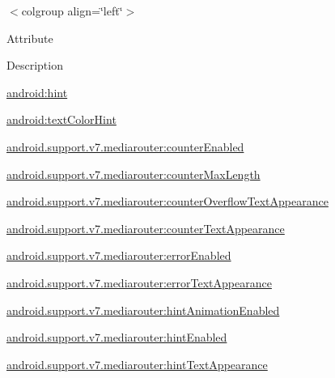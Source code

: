 \tabulinesep=1mm
\begin{longtabu} spread 0pt [c]{*{0}{|X[-1]}|}
\hline
\end{longtabu}
$<$colgroup align=\char`\"{}left\char`\"{}$>$ 

Attribute

Description 

{\ttfamily \hyperlink{classandroid_1_1support_1_1v7_1_1mediarouter_1_1R_1_1styleable_a9a349e2d2e549ba75b3cd7d7843904c6}{android\+:hint}}

{\ttfamily \hyperlink{classandroid_1_1support_1_1v7_1_1mediarouter_1_1R_1_1styleable_a4b215970513b838b98f7dd32725bd67b}{android\+:text\+Color\+Hint}}

{\ttfamily \hyperlink{classandroid_1_1support_1_1v7_1_1mediarouter_1_1R_1_1styleable_a53328a693db3d3cdbec7e92369b8e2e8}{android.\+support.\+v7.\+mediarouter\+:counter\+Enabled}}

{\ttfamily \hyperlink{classandroid_1_1support_1_1v7_1_1mediarouter_1_1R_1_1styleable_a930a315bdfd694267732a06661f7e664}{android.\+support.\+v7.\+mediarouter\+:counter\+Max\+Length}}

{\ttfamily \hyperlink{classandroid_1_1support_1_1v7_1_1mediarouter_1_1R_1_1styleable_a6b4f04d61761f9eee7e2fd1a97c8503f}{android.\+support.\+v7.\+mediarouter\+:counter\+Overflow\+Text\+Appearance}}

{\ttfamily \hyperlink{classandroid_1_1support_1_1v7_1_1mediarouter_1_1R_1_1styleable_ae9e5833b8f6e6eecad4561363b0a89cb}{android.\+support.\+v7.\+mediarouter\+:counter\+Text\+Appearance}}

{\ttfamily \hyperlink{classandroid_1_1support_1_1v7_1_1mediarouter_1_1R_1_1styleable_a3bb087258c99f0fc35c00751b6ce5741}{android.\+support.\+v7.\+mediarouter\+:error\+Enabled}}

{\ttfamily \hyperlink{classandroid_1_1support_1_1v7_1_1mediarouter_1_1R_1_1styleable_ae6737e6924f3c3da1826890fae0f258b}{android.\+support.\+v7.\+mediarouter\+:error\+Text\+Appearance}}

{\ttfamily \hyperlink{classandroid_1_1support_1_1v7_1_1mediarouter_1_1R_1_1styleable_ac0c7f954fdab6a754ad01fdbc4aeb6ca}{android.\+support.\+v7.\+mediarouter\+:hint\+Animation\+Enabled}}

{\ttfamily \hyperlink{classandroid_1_1support_1_1v7_1_1mediarouter_1_1R_1_1styleable_a3a615e7612252cf50e0e7e212dae5195}{android.\+support.\+v7.\+mediarouter\+:hint\+Enabled}}

{\ttfamily \hyperlink{classandroid_1_1support_1_1v7_1_1mediarouter_1_1R_1_1styleable_ab6a59dd02f3aa6519088694189ebef61}{android.\+support.\+v7.\+mediarouter\+:hint\+Text\+Appearance}}

